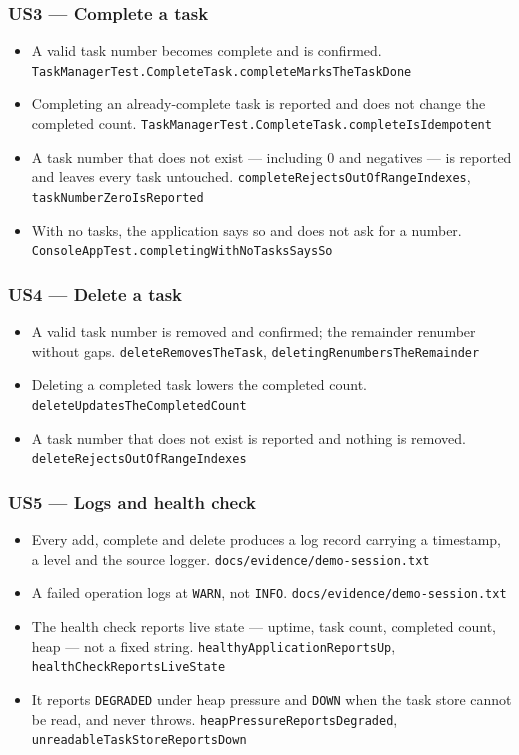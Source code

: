 \documentclass[11pt,a4paper]{article}
\newcommand{\code}[1]{\texttt{\small #1}}
\begin{document}
\subsubsection*{US3 --- Complete a task}
\begin{itemize}
  \item A valid task number becomes complete and is confirmed. \hfill
        \code{TaskManagerTest.CompleteTask.completeMarksTheTaskDone}
  \item Completing an already-complete task is reported and does not change the
        completed count. \hfill
        \code{TaskManagerTest.CompleteTask.completeIsIdempotent}
  \item A task number that does not exist --- including 0 and negatives --- is
        reported and leaves every task untouched. \hfill
        \code{completeRejectsOutOfRangeIndexes}, \code{taskNumberZeroIsReported}
  \item With no tasks, the application says so and does not ask for a number.
        \hfill \code{ConsoleAppTest.completingWithNoTasksSaysSo}
\end{itemize}

\subsubsection*{US4 --- Delete a task}
\begin{itemize}
  \item A valid task number is removed and confirmed; the remainder renumber
        without gaps. \hfill \code{deleteRemovesTheTask},
        \code{deletingRenumbersTheRemainder}
  \item Deleting a completed task lowers the completed count. \hfill
        \code{deleteUpdatesTheCompletedCount}
  \item A task number that does not exist is reported and nothing is removed.
        \hfill \code{deleteRejectsOutOfRangeIndexes}
\end{itemize}

\subsubsection*{US5 --- Logs and health check}
\begin{itemize}
  \item Every add, complete and delete produces a log record carrying a
        timestamp, a level and the source logger. \hfill
        \code{docs/evidence/demo-session.txt}
  \item A failed operation logs at \code{WARN}, not \code{INFO}. \hfill
        \code{docs/evidence/demo-session.txt}
  \item The health check reports live state --- uptime, task count, completed
        count, heap --- not a fixed string. \hfill
        \code{healthyApplicationReportsUp}, \code{healthCheckReportsLiveState}
  \item It reports \code{DEGRADED} under heap pressure and \code{DOWN} when the
        task store cannot be read, and never throws. \hfill
        \code{heapPressureReportsDegraded}, \code{unreadableTaskStoreReportsDown}
\end{itemize}
\end{document}
